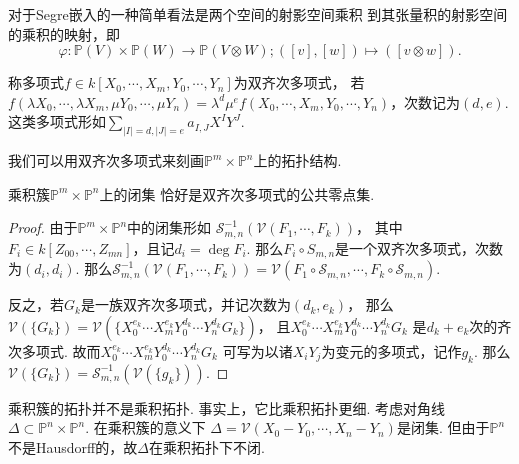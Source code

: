     \begin{remark}
        对于Segre嵌入的一种简单看法是两个空间的射影空间乘积
        到其张量积的射影空间的乘积的映射，即
        \[\varphi\colon\mathbb{P}(V) \times \mathbb{P}(W) \rightarrow \mathbb{P}(V \otimes W);
        ([v],[w]) \mapsto ([v \otimes w]).\]
    \end{remark}

    \begin{definition}
        称多项式$f \in k[X_{0},\cdots,X_{m},Y_{0},\cdots,Y_{n}]$为双齐次多项式，
        若$f(\lambda X_{0},\cdots,\lambda X_{m},\mu Y_{0},\cdots,\mu Y_{n})=
        \lambda^{d}\mu^{e}f(X_{0},\cdots,X_{m},Y_{0},\cdots,Y_{n})$，次数记为$(d,e)$.
        这类多项式形如$\sum_{|I|=d,|J|=e}a_{I,J}X^{I}Y^{J}$.
    \end{definition}

    我们可以用双齐次多项式来刻画$\mathbb{P}^{m} \times \mathbb{P}^{n}$上的拓扑结构.
    \begin{proposition}
        乘积簇$\mathbb{P}^{m} \times \mathbb{P}^{n}$上的闭集
        恰好是双齐次多项式的公共零点集.
    \end{proposition}
    \begin{proof}
        由于$\mathbb{P}^{m} \times \mathbb{P}^{n}$中的闭集形如
        $\mathcal{S}_{m,n}^{-1}(\mathcal{V}(F_{1},\cdots,F_{k}))$，
        其中$F_{i} \in k[Z_{00},\cdots,Z_{mn}]$，且记$d_{i} = \deg F_{i}$. 
        那么$F_{i} \circ S_{m,n}$是一个双齐次多项式，次数为$(d_{i},d_{i})$. 
        那么$\mathcal{S}_{m,n}^{-1}(\mathcal{V}(F_{1},\cdots,F_{k})) = 
        \mathcal{V}(F_{1} \circ \mathcal{S}_{m,n},\cdots,F_{k} \circ \mathcal{S}_{m,n})$. \par
        反之，若$G_{k}$是一族双齐次多项式，并记次数为$(d_{k},e_{k})$，
        那么$\mathcal{V}(\{G_{k}\})=
        \mathcal{V}(\{X_{0}^{e_{k}}\cdots X_{m}^{e_{k}}Y_{0}^{d_{k}}\cdots Y_{n}^{d_{k}}G_{k}\})$，
        且$X_{0}^{e_{k}}\cdots X_{m}^{e_{k}}Y_{0}^{d_{k}}\cdots Y_{n}^{d_{k}}G_{k}$
        是$d_{k}+e_{k}$次的齐次多项式. 
        故而$X_{0}^{e_{k}}\cdots X_{m}^{e_{k}}Y_{0}^{d_{k}}\cdots Y_{n}^{d_{k}}G_{k}$
        可写为以诸$X_{i}Y_{j}$为变元的多项式，记作$g_{k}$.
        那么$\mathcal{V}(\{G_{k}\})=\mathcal{S}_{m,n}^{-1}(\mathcal{V}(\{g_{k}\}))$.
    \end{proof}

    \begin{remark}
        乘积簇的拓扑并不是乘积拓扑. 事实上，它比乘积拓扑更细. 考虑对角线
        $\Delta \subset \mathbb{P}^{n} \times \mathbb{P}^{n}$. 在乘积簇的意义下
        $\Delta=\mathcal{V}(X_{0}-Y_{0},\cdots,X_{n}-Y_{n})$是闭集. 
        但由于$\mathbb{P}^{n}$不是Hausdorff的，故$\Delta$在乘积拓扑下不闭.
    \end{remark}

